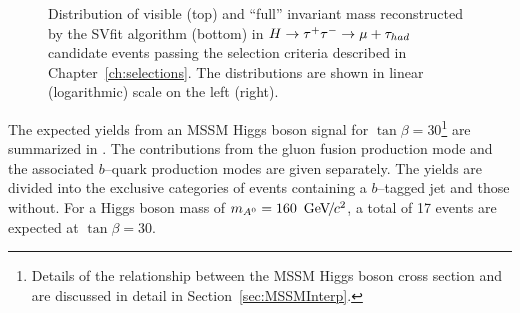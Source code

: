 \begin{figure}
\begin{center}
\caption[Distributions of final selected events]{Distribution of visible (top)
and ``full'' \TT invariant mass reconstructed by the SVfit algorithm (bottom) in
\mbox{$H \to \tau^+\tau^- \to \mu + \tau_{had}$} candidate events passing the selection
criteria described in Chapter~\ref{ch:selections}.  The distributions are shown
in linear (logarithmic) scale on the left (right).}
\label{fig:AHtoMuTauPlotsLoose}
\end{center}
\end{figure} 

The expected yields from an MSSM Higgs boson signal for \mbox{$\tan\beta =
30$}\footnote{Details of the relationship between the MSSM Higgs boson cross section
and \tb are discussed in detail in Section~\ref{sec:MSSMInterp}.}
are summarized in \label{tab:SignalExpResultsLooseAHtoMuTau}.  The contributions
from the gluon fusion production mode and the associated $b$--quark production
modes are given separately.  The yields are divided into the exclusive
categories of events containing a \mbox{$b$--tagged} jet and those without.  For a
Higgs boson mass of $m_{A^0} = 160~{\,\text{Ge\hspace{-.08em}V\hspace{-0.16em}/\hspace{-0.08em}}c^\text{2}}$, a total of 17 events are expected at
$\tan\beta = 30$.
%
